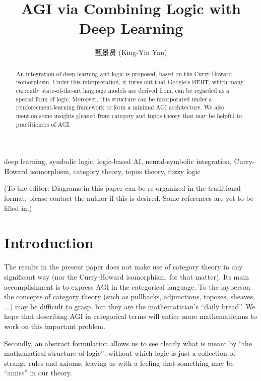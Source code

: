 \documentclass[orivec]{llncs}
\title{AGI via Combining Logic with Deep Learning}
\author{
甄景贤 (King-Yin Yan) 
}
\institute{General.Intelligence@Gmail.com}
\begin{document}
\maketitle

\setlength{\parindent}{0em}
\setlength{\parskip}{2.8ex plus0.8ex minus0.8ex}

\begin{abstract}
An integration of deep learning and logic is proposed, based on the Curry-Howard isomorphism.  Under this interpretation, it turns out that Google's BERT, which many currently state-of-the-art language models are derived from, can be regarded as a special form of logic.  Moreover, this structure can be incorporated under a reinforcement-learning framework to form a minimal AGI architecture.  We also mention some insights gleaned from category and topos theory that may be helpful to practitioners of AGI.
\end{abstract}

\begin{keywords}
deep learning, symbolic logic, logic-based AI, neural-symbolic integration, Curry-Howard isomorphism, category theory, topos theory, fuzzy logic
\end{keywords}

{\color{red}(To the editor:  Diagrams in this paper can be re-organized in the traditional format, please contact the author if this is desired.  Some references are yet to be filled in.)}

\setcounter{section}{-1}
\section{Introduction}
\label{sec:0}

The results in the present paper does not make use of category theory in any significant way (nor the Curry-Howard isomorphism, for that matter).  Its main accomplishment is to express AGI in the categorical language.  To the layperson the concepts of category theory (such as pullbacks, adjunctions, toposes, sheaves, ...) may be difficult to grasp, but they are the mathematician's ``daily bread''.  We hope that describing AGI in categorical terms will entice more mathematicians to work on this important problem.

Secondly, an abstract formulation allows us to see clearly what is meant by ``the mathematical structure of logic'', without which logic is just a collection of strange rules and axioms, leaving us with a feeling that something may be ``amiss'' in our theory.
\end{document}
